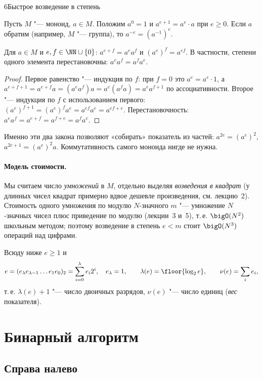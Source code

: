 \begin{lecture}{6}{Быстрое возведение в степень}
\begin{definition}
Пусть $M$ "--- моноид, $a \in M$. Положим $a^0 = 1$ и $a^{e+1} = a^e \cdot a$ при $e \ge 0$.
Если $a$ обратим (например, $M$ "--- группа), то $a^{-e} = (a^{-1})^e$.
\end{definition}

\begin{proposition}\label{l6:powlaws}
Для $a \in M$ и $e, f \in \NN \cup \{0\}$: $a^{e+f} = a^e a^f$ и $(a^e)^f = a^{ef}$.
В частности, степени одного элемента перестановочны: $a^e a^f = a^f a^e$.
\end{proposition}

\begin{proof}
Первое равенство "--- индукция по $f$: при $f = 0$ это $a^e = a^e \cdot 1$, а
$a^{e+f+1} = a^{e+f} a = (a^e a^f) a = a^e (a^f a) = a^e a^{f+1}$ по ассоциативности.
Второе "--- индукция по $f$ с использованием первого: $(a^e)^{f+1} = (a^e)^f a^e = a^{ef} a^e
= a^{ef+e}$. Перестановочность: $a^e a^f = a^{e+f} = a^{f+e} = a^f a^e$.
\end{proof}

Именно эти два закона позволяют «собирать» показатель из частей: $a^{2e} = (a^e)^2$,
$a^{2e+1} = (a^e)^2 a$. Коммутативность самого моноида нигде не нужна.

\paragraph{Модель стоимости.} Мы считаем число \emph{умножений} в $M$, отдельно выделяя
\emph{возведения в квадрат} (у длинных чисел квадрат примерно вдвое дешевле произведения,
см. лекцию~2). Стоимость одного умножения по модулю $N$-значного $m$ "--- умножение
$N$-значных чисел плюс приведение по модулю (лекции~3 и~5), т.\,е. $\bigO(N^2)$ школьным
методом; поэтому возведение в степень $e < m$ стоит $\bigO(N^3)$ операций над цифрами.

Всюду ниже $e \ge 1$ и
\[
  e = (e_\lambda e_{\lambda-1} \dots e_1 e_0)_2 = \sum_{i=0}^{\lambda} e_i 2^i, \quad e_\lambda = 1,
  \qquad \lambda(e) = \floor{\log_2 e}, \qquad \nu(e) = \sum_i e_i,
\]
т.\,е. $\lambda(e) + 1$ "--- число двоичных разрядов, $\nu(e)$ "--- число единиц
(\emph{вес} показателя).

\section{Бинарный алгоритм}

\subsection{Справа налево}


\end{lecture}
